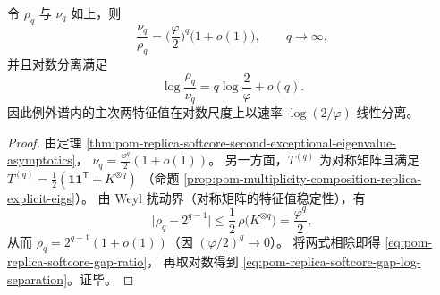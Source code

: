\begin{theorem}[谱隙比率的指数律与对数分离速率]\label{thm:pom-replica-softcore-gap-ratio-log-separation}
令 \(\rho_q\) 与 \(\nu_q\) 如上，则
\begin{equation}\label{eq:pom-replica-softcore-gap-ratio}
\frac{\nu_q}{\rho_q}
=\Big(\frac{\varphi}{2}\Big)^{q}\Big(1+o(1)\Big),
\qquad q\to\infty,
\end{equation}
并且对数分离满足
\begin{equation}\label{eq:pom-replica-softcore-gap-log-separation}
\log\frac{\rho_q}{\nu_q}
= q\log\frac{2}{\varphi}+o(q).
\end{equation}
因此例外谱内的主次两特征值在对数尺度上以速率 \(\log(2/\varphi)\) 线性分离。
\end{theorem}
\begin{proof}
由定理 \ref{thm:pom-replica-softcore-second-exceptional-eigenvalue-asymptotics}，
\(
\nu_q=\frac{\varphi^q}{2}(1+o(1))
\)。
另一方面，\(T^{(q)}\) 为对称矩阵且满足
\(
T^{(q)}=\frac12(\mathbf{1}\mathbf{1}^{\mathsf T}+K^{\otimes q})
\)
（命题 \ref{prop:pom-multiplicity-composition-replica-explicit-eigs}）。
由 Weyl 扰动界（对称矩阵的特征值稳定性），有
\[
\bigl|\rho_q-2^{q-1}\bigr|
\le \frac12\,\rho\!\bigl(K^{\otimes q}\bigr)
=\frac{\varphi^q}{2},
\]
从而 \(\rho_q=2^{q-1}(1+o(1))\)（因 \((\varphi/2)^q\to 0\)）。
将两式相除即得 \eqref{eq:pom-replica-softcore-gap-ratio}，
再取对数得到 \eqref{eq:pom-replica-softcore-gap-log-separation}。证毕。
\end{proof}

